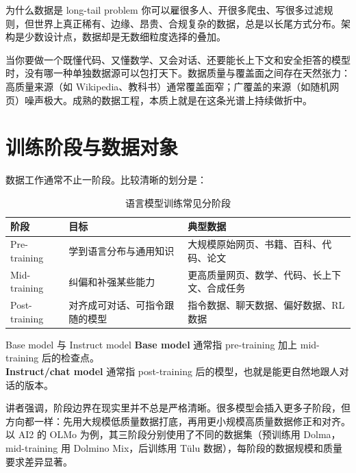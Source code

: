 \documentclass[a4paper]{article}
\begin{document}
\begin{knowledgebox}{为什么数据是 long-tail problem}
你可以雇很多人、开很多爬虫、写很多过滤规则，但世界上真正稀有、边缘、昂贵、合规复杂的数据，总是以长尾方式分布。架构是少数设计点，数据却是无数细粒度选择的叠加。
\end{knowledgebox}

当你要做一个既懂代码、又懂数学、又会对话、还要能长上下文和安全拒答的模型时，没有哪一种单独数据源可以包打天下。数据质量与覆盖面之间存在天然张力：高质量来源（如 Wikipedia、教科书）通常覆盖面窄；广覆盖的来源（如随机网页）噪声极大。成熟的数据工程，本质上就是在这条光谱上持续做折中。

\section{训练阶段与数据对象}

数据工作通常不止一阶段。比较清晰的划分是：

\begin{table}[H]
\centering
\begin{tabular}{p{}p{}p{}}
\toprule
\textbf{阶段} & \textbf{目标} & \textbf{典型数据} \\
\midrule
Pre-training & 学到语言分布与通用知识 & 大规模原始网页、书籍、百科、代码、论文 \\
Mid-training & 纠偏和补强某些能力 & 更高质量网页、数学、代码、长上下文、合成任务 \\
Post-training & 对齐成可对话、可指令跟随的模型 & 指令数据、聊天数据、偏好数据、RL 数据 \\
\bottomrule
\end{tabular}
\caption{语言模型训练常见分阶段}
\end{table}

\begin{knowledgebox}{Base model 与 Instruct model}
\textbf{Base model} 通常指 pre-training 加上 mid-training 后的检查点。\\
\textbf{Instruct/chat model} 通常指 post-training 后的模型，也就是能更自然地跟人对话的版本。
\end{knowledgebox}

讲者强调，阶段边界在现实里并不总是严格清晰。很多模型会插入更多子阶段，但方向都一样：先用大规模低质量数据打底，再用更小规模高质量数据修正和对齐。以 AI2 的 OLMo 为例，其三阶段分别使用了不同的数据集（预训练用 Dolma，mid-training 用 Dolmino Mix，后训练用 T\"ulu 数据），每阶段的数据规模和质量要求差异显著。
\end{document}

